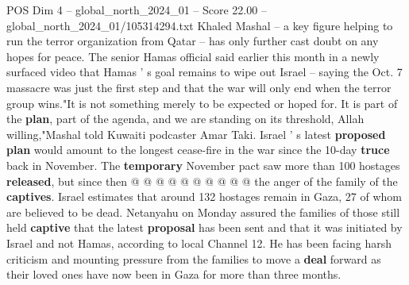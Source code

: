 \begin{textsample}{POS Dim 4 – global\_north\_2024\_01 – Score 22.00 – global\_north\_2024\_01/105314294.txt}
Khaled Mashal -- a key figure helping to run the terror organization from Qatar -- has only further cast doubt on any hopes for peace.
The senior Hamas official said earlier this month in a newly surfaced video that Hamas ' s goal remains to wipe out Israel -- saying the Oct. 7 massacre was just the first step and that the war will only end when the terror group wins."It is not something merely to be expected or hoped for.
It is part of the \textbf{plan}, part of the agenda, and we are standing on its threshold, Allah willing,"Mashal told Kuwaiti podcaster Amar Taki.
Israel ' s latest \textbf{proposed} \textbf{plan} would amount to the longest cease-fire in the war since the 10-day \textbf{truce} back in November.
The \textbf{temporary} November pact saw more than 100 hostages \textbf{released}, but since then @ @ @ @ @ @ @ @ @ @ the anger of the family of the \textbf{captives}.
Israel estimates that around 132 hostages remain in Gaza, 27 of whom are believed to be dead.
Netanyahu on Monday assured the families of those still held \textbf{captive} that the latest \textbf{proposal} has been sent and that it was initiated by Israel and not Hamas, according to local Channel 12.
He has been facing harsh criticism and mounting pressure from the families to move a \textbf{deal} forward as their loved ones have now been in Gaza for more than three months.

\end{textsample}
